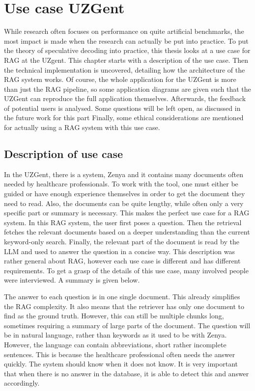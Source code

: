 
\chapter{Use case UZGent}
While research often focuses on performance on quite artificial benchmarks, the most impact is made when the research can actually be put into practice. To put the theory of speculative decoding into practice, this thesis looks at a use case for RAG at the UZgent. This chapter starts with a description of the use case. Then the technical implementation is uncovered, detailing how the architecture of the RAG system works. Of course, the whole application for the UZGent is more than just the RAG pipeline, so some application diagrams are given such that the UZGent can reproduce the full application themselves. Afterwards, the feedback of potential users is analysed. Some questions will be left open, as discussed in the future work for this part Finally, some ethical considerations are mentioned for actually using a RAG system with this use case.

\section{Description of use case}
In the UZGent, there is a system, Zenya and it contains many documents often needed by healthcare professionals. To work with the tool, one must either be guided or have enough experience themselves in order to get the document they need to read. Also, the documents can be quite lengthy, while often only a very specific part or summary is necessary. This makes the perfect use case for a RAG system. In this RAG system, the user first poses a question. Then the retrieval fetches the relevant documents based on a deeper understanding than the current keyword-only search. Finally, the relevant part of the document is read by the LLM and used to answer the question in a concise way. This description was rather general about RAG, however each use case is different and has different requirements. To get a grasp of the details of this use case, many involved people were interviewed. A summary is given below.

The answer to each question is in one single document. This already simplifies the RAG complexity. It also means that the retriever has only one document to find as the ground truth. However, this can still be multiple chunks long, sometimes requiring a summary of large parts of the document.
The question will be in natural language, rather than keywords as it used to be with Zenya. However, the language can contain abbreviations, short rather incomplete sentences. This is because the healthcare professional often needs the answer quickly.
The system should know when it does not know. It is very important that when there is no answer in the database, it is able to detect this and answer accordingly.

